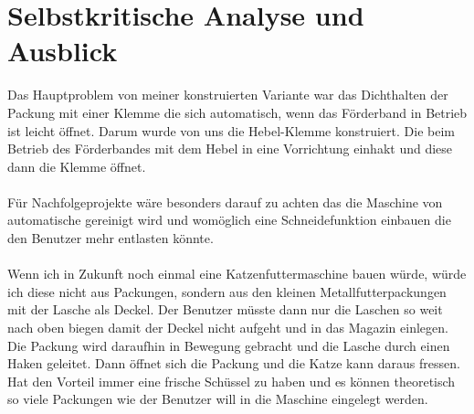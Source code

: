 \section{Selbstkritische Analyse und Ausblick}

Das Hauptproblem von meiner konstruierten Variante war das Dichthalten der Packung mit einer Klemme die sich automatisch, wenn das Förderband in Betrieb ist leicht öffnet. Darum wurde von uns die Hebel-Klemme konstruiert. Die beim Betrieb des Förderbandes mit dem Hebel in eine Vorrichtung einhakt und diese dann die Klemme öffnet. \\
\\
Für Nachfolgeprojekte wäre besonders darauf zu achten das die Maschine von automatische gereinigt wird und womöglich eine Schneidefunktion einbauen die den Benutzer mehr entlasten könnte.\\
\\
Wenn ich in Zukunft noch einmal eine Katzenfuttermaschine bauen würde, würde ich diese nicht aus Packungen, sondern aus den kleinen Metallfutterpackungen mit der Lasche als Deckel. Der Benutzer müsste dann nur die Laschen so weit nach oben biegen damit der Deckel nicht aufgeht und in das Magazin einlegen. Die Packung wird daraufhin in Bewegung gebracht und die Lasche durch einen Haken geleitet. Dann öffnet sich die Packung und die Katze kann daraus fressen. Hat den Vorteil immer eine frische Schüssel zu haben und es können theoretisch so viele Packungen wie der Benutzer will in die Maschine eingelegt werden. \\
 
